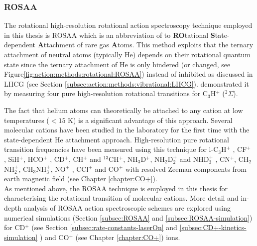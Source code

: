 \subsubsection{ROSAA}
\label{subsec:action:methods:rotational:ROSAA}

The rotational high-resolution rotational action spectroscopy technique
employed in this thesis is ROSAA which is an abbreviation of to
\textbf{RO}tational \textbf{S}tate-dependent \textbf{A}ttachment of rare gas
\textbf{A}toms. This method exploits that the ternary attachment of neutral
atoms (typically He) depends on their rotational quantum state since the
ternary attachment of He is only hindered (or changed, see
Figure\ref{fig:action:methods:rotational:ROSAA}) instead of inhibited as
discussed in LIICG (see Section \ref{subsec:action:methods:vibrational:LIICG}).
\citet{brunken_laboratory_2014} demonstrated it by measuring four pure
high-resolution rotational transitions for C$_3$H$^+$ ($^2\Sigma$).

The fact that helium atoms can theoretically be attached to any cation at low
temperatures ($<15$ K) is a significant advantage of this approach. Several
molecular cations have been studied in the laboratory for the first time with
the state-dependent He attachment approach. High-resolution pure rotational
transition frequencies have been measured using this technique for l-C$_3$H$^+$
\cite{brunken_laboratory_2014}, CF$^+$ \cite{stoffels_laboratory_2016},
SiH$^+$\cite{domenech2017}, HCO$^+$ \cite{salomon_double_2019},
CD$^+$\cite{Brunken2017}, CH$^+$ and $^{13}$CH$^+$\cite{domenech_first_2018},
NH$_3$D$^+$\cite{stoffels_laboratory_2016, domenech_accurate_2018},
NH$_2$D$_2^+$ and NHD$_3^+$ \cite{domenech_accurate_2018},
CN$^+$\cite{thorwirth_pure_2019}, CH$_2$NH$_2^+$\cite{Markus2019},
CH$_3$NH$_3^+$\cite{schmid_rotational_2022}, NO$^+$
\cite{asvany_fundamental_2021}, CCl$^+$\cite{asvany_pure_2021} and CO$^+$ with
resolved Zeeman components from earth magnetic field
\cite{marimuthu_zeeman_2022, Brunken2017} (see Chapter \ref{chapter:CO+}).\\

As mentioned above, the ROSAA technique is employed in this thesis for
characterising the rotational transition of molecular cations. More detail and
in-depth analysis of ROSAA action spectroscopic schemes are explored using
numerical simulations (Section \ref{subsec:ROSAA} and
\ref{subsec:ROSAA-simulation}) for CD$^+$ (see Section
\ref{subsec:rate-constants-laserOn} and \ref{subsec:CD+-kinetics-simulation} )
and CO$^+$ (see Chapter \ref{chapter:CO+}) ions.

